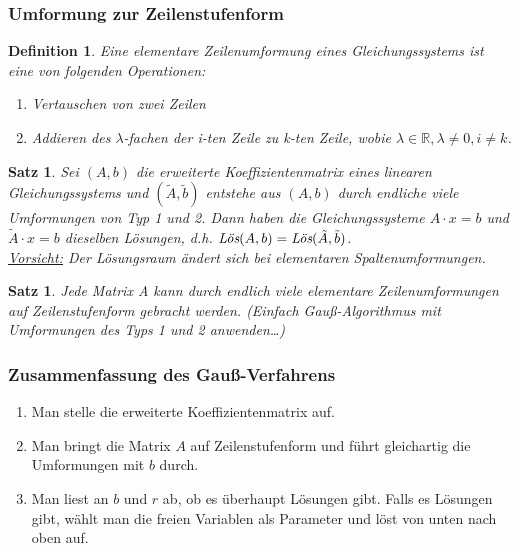 \documentclass[12pt,a4paper]{article}
\theoremstyle{plain}
\newtheorem{Satz}[Theorem]{Satz}
\newtheorem{Definition}[Theorem]{Definition}
\newcommand{\R}{\mathbb{R}}
\numberwithin{equation}{section}
\begin{document}
\subsubsection{Umformung zur Zeilenstufenform}
\begin{Definition}
Eine elementare Zeilenumformung eines Gleichungssystems ist eine von folgenden Operationen: \begin{enumerate}
\item Vertauschen von zwei Zeilen
\item Addieren des $\lambda$-fachen der i-ten Zeile zu k-ten Zeile, wobie $\lambda\in\R,\lambda\neq 0,i\neq k$.
\end{enumerate}
\end{Definition}
\begin{Satz}
Sei $(A,b)$ die erweiterte Koeffizientenmatrix eines linearen Gleichungssystems und $(\tilde{A},\tilde{b})$ entstehe aus $(A,b)$ durch endliche viele Umformungen von Typ 1 und 2. Dann haben die Gleichungssysteme $A\cdot x=b$ und $\tilde{A}\cdot x=b$ dieselben Lösungen, d.h. $\emph{Lös}(A,b)=\emph{Lös}(\tilde{A},\tilde{b})$.\\
\underline{Vorsicht:} Der Lösungsraum ändert sich bei elementaren Spaltenumformungen.
\end{Satz}
\begin{Satz}
Jede Matrix A kann durch endlich viele elementare Zeilenumformungen auf Zeilenstufenform gebracht werden. (Einfach Gauß-Algorithmus mit Umformungen des Typs 1 und 2 anwenden\ldots)
\end{Satz}
\subsubsection{Zusammenfassung des Gauß-Verfahrens}
\begin{enumerate}
\item Man stelle die erweiterte Koeffizientenmatrix auf.
\item Man bringt die Matrix $A$ auf Zeilenstufenform und führt gleichartig die Umformungen mit $b$ durch.
\item Man liest an $b$ und $r$ ab, ob es überhaupt Lösungen gibt. Falls es Lösungen gibt, wählt man die freien Variablen als Parameter und löst von unten nach oben auf.
\end{enumerate}
\end{document}
